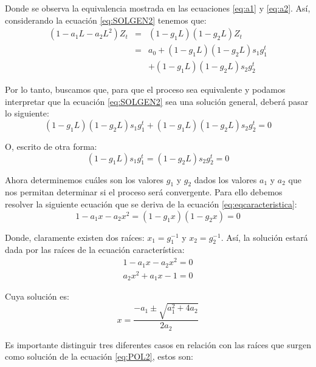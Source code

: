 \documentclass[
]{book}
\begin{document}
Donde se observa la equivalencia mostrada en las ecuaciones \eqref{eq:a1} y \eqref{eq:a2}. Así, considerando la ecuación \eqref{eq:SOLGEN2} tenemos que:
\begin{eqnarray}
    (1 - a_1 L - a_2 L^2) Z_t & = & (1 - g_1 L)(1 - g_2 L) Z_t \nonumber \\
    & = & a_0 + (1 - g_1 L)(1 - g_2 L) s_1 g^t_1 \nonumber \\
    &  & + (1 - g_1 L)(1 - g_2 L) s_2 g^t_2
    \label{eq:eqcaracteristica1}
\end{eqnarray}

Por lo tanto, buscamos que, para que el proceso sea equivalente y podamos interpretar que la ecuación \eqref{eq:SOLGEN2} sea una solución general, deberá pasar lo siguiente:
\begin{equation}
    (1 - g_1 L) (1 - g_2 L) s_1 g^t_1 + (1 - g_1 L) (1 - g_2 L) s_2 g^t_2 = 0
    \label{eq:eqcaracteristica2}
\end{equation}

O, escrito de otra forma:
\begin{equation}
    (1 - g_1 L) s_1 g^t_1 = (1 - g_2 L) s_2 g^t_2 = 0
    \label{eq:eqcaracteristica3}
\end{equation}

Ahora determinemos cuáles son los valores \(g_1\) y \(g_2\) dados los valores \(a_1\) y \(a_2\) que nos permitan determinar si el proceso será convergente. Para ello debemos resolver la siguiente ecuación que se deriva de la ecuación \eqref{eq:eqcaracteristica}:
\begin{equation}
    1 - a_1 x - a_2 x^2 = (1 - g_1 x)(1 - g_2 x) = 0
    \label{eq:eqcaracteristica4}
\end{equation}

Donde, claramente existen dos raíces: \(x_1 = g^{-1}_1\) y \(x_2 = g^{-1}_2\). Así, la solución estará dada por las raíces de la ecuación característica:
\begin{eqnarray}
    1 - a_1 x - a_2 x^2 = 0 \nonumber \\
    a_2 x^2 + a_1 x - 1 = 0
    \label{eq:POL2}
\end{eqnarray}

Cuya solución es:
\begin{equation}
    x = \frac{- a_1 \pm \sqrt{a^2_1 + 4 a_2}}{2 a_2}
    \label{eq:eqcaracteristica5}
\end{equation}

Es importante distinguir tres diferentes casos en relación con las raíces que surgen como solución de la ecuación \eqref{eq:POL2}, estos son:
\end{document}
